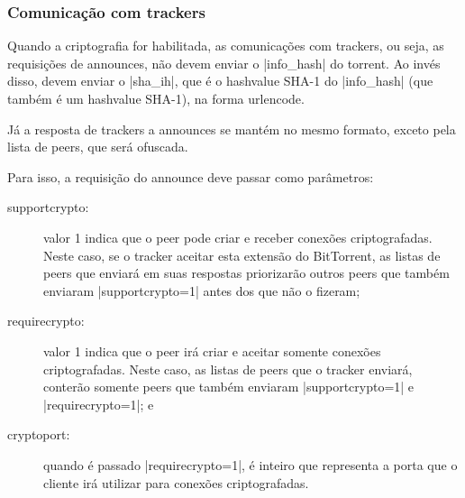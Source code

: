 
\subsubsection*{Comunicação com trackers}

Quando a criptografia for habilitada, as comunicações com \glspl*{tracker}, ou seja, as
requisições de \glspl{announce}, não devem enviar o \bverb|info_hash| do \gls*{torrent}.
Ao invés disso, devem enviar o \bverb|sha_ih|, que é o \gls*{hashvalue} SHA-1 do
\bverb|info_hash| (que também é um \gls*{hashvalue} SHA-1), na forma \gls*{urlencode}.

Já a resposta de \glspl*{tracker} a \glspl*{announce} se mantém no mesmo formato,
exceto pela lista de \glspl*{peer}, que será ofuscada.

Para isso, a requisição do \gls*{announce} deve passar como parâmetros:

\begin{description}
    \item[supportcrypto:] valor 1 indica que o \gls*{peer} pode criar e receber
        conexões criptografadas. Neste caso, se o \gls*{tracker} aceitar esta extensão
        do BitTorrent, as listas de \glspl*{peer} que enviará em suas respostas
        priorizarão outros \glspl*{peer} que também enviaram \bverb|supportcrypto=1|
        antes dos que não o fizeram;

    \item[requirecrypto:] valor 1 indica que o \gls*{peer} irá criar e aceitar somente
        conexões criptografadas. Neste caso, as listas de \glspl*{peer} que o
        \gls*{tracker} enviará, conterão somente \glspl*{peer} que também enviaram
        \bverb|supportcrypto=1| e \bverb|requirecrypto=1|; e

    \item[cryptoport:] quando é passado \bverb|requirecrypto=1|, é inteiro que
        representa a porta que o cliente irá utilizar para conexões criptografadas.
\end{description}

